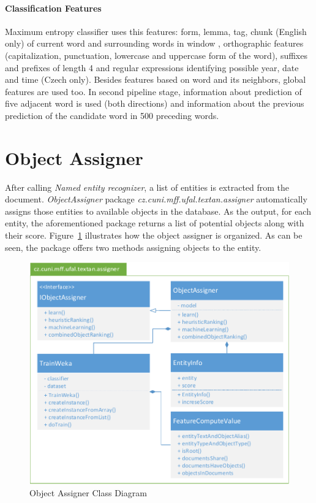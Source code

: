 \paragraph{Classification Features}
Maximum entropy classifier uses this features: form, lemma, tag, chunk (English only) of current word and surrounding words in window
, orthographic features (capitalization, punctuation, lowercase and uppercase form of
the word), suffixes and prefixes of length 4 and regular expressions identifying possible
year, date and time (Czech only).
Besides features based on word and its neighbors, global features are used too. In second pipeline stage, information about prediction of five adjacent word is used (both directions) and information about the previous prediction of the candidate word in 500 preceding words.

\section{Object Assigner}
\label{sec:ObjectAssigner}

After calling \emph{Named entity recognizer}, a list of entities is extracted
from the document. \emph{ObjectAssigner} package \emph{cz.\-cuni.\-mff.\-ufal.\-textan.\-assigner}
automatically assigns those entities to
available objects in the database. As the output, for each entity, the
aforementioned package returns a list of potential objects along
with their score. Figure~\ref{fig:objectassigner} illustrates 
how the object assigner is organized. As can be seen, the package offers 
two methods assigning objects to the entity.

\begin{figure}[!htb]
        \centering
        \includegraphics[width=\textwidth]{Images/ObjectAssignerClass}
        \caption{Object Assigner Class Diagram}
        \label{fig:objectassigner}
\end{figure}


